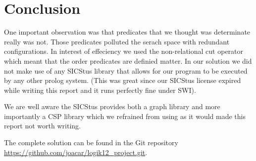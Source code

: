 \documentclass[a4paper,12pt]{article}
\begin{document}
\section*{Conclusion}
One important observation was that predicates that we thought was determinate really was not. Those predicates polluted the serach space with redundant configurations. In interest of effeciency we used the non-relational cut operator which meant that the order predicates are definied matter.
In our solution we did not make use of any SICStus library that allows for our program to be executed by any other prolog system. (This was great since our SICStus license expired while writing this report and it runs perfectly fine under SWI).

We are well aware the SICStus provides both a graph library and more importantly a CSP library which we refrained from using as it would made this report not worth writing.


The complete solution can be found in the Git repository \url{https://github.com/joacar/logik12_project.git}.
\end{document}
